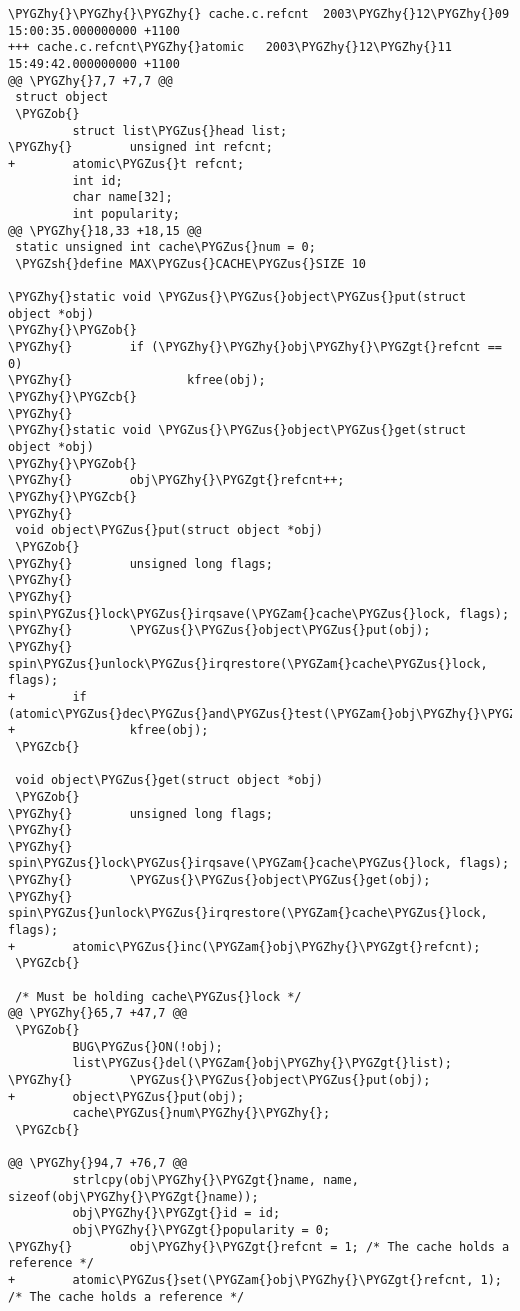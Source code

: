 \documentclass[a4paper,8pt,english]{sphinxmanual}
\def\PYGZus{\char`\_}
\def\PYGZob{\char`\{}
\def\PYGZcb{\char`\}}
\def\PYGZam{\char`\&}
\def\PYGZgt{\char`\>}
\def\PYGZsh{\char`\#}
\def\PYGZhy{\char`\-}
\begin{document}
\begin{Verbatim}[commandchars=\\\{\}]
\PYGZhy{}\PYGZhy{}\PYGZhy{} cache.c.refcnt  2003\PYGZhy{}12\PYGZhy{}09 15:00:35.000000000 +1100
+++ cache.c.refcnt\PYGZhy{}atomic   2003\PYGZhy{}12\PYGZhy{}11 15:49:42.000000000 +1100
@@ \PYGZhy{}7,7 +7,7 @@
 struct object
 \PYGZob{}
         struct list\PYGZus{}head list;
\PYGZhy{}        unsigned int refcnt;
+        atomic\PYGZus{}t refcnt;
         int id;
         char name[32];
         int popularity;
@@ \PYGZhy{}18,33 +18,15 @@
 static unsigned int cache\PYGZus{}num = 0;
 \PYGZsh{}define MAX\PYGZus{}CACHE\PYGZus{}SIZE 10

\PYGZhy{}static void \PYGZus{}\PYGZus{}object\PYGZus{}put(struct object *obj)
\PYGZhy{}\PYGZob{}
\PYGZhy{}        if (\PYGZhy{}\PYGZhy{}obj\PYGZhy{}\PYGZgt{}refcnt == 0)
\PYGZhy{}                kfree(obj);
\PYGZhy{}\PYGZcb{}
\PYGZhy{}
\PYGZhy{}static void \PYGZus{}\PYGZus{}object\PYGZus{}get(struct object *obj)
\PYGZhy{}\PYGZob{}
\PYGZhy{}        obj\PYGZhy{}\PYGZgt{}refcnt++;
\PYGZhy{}\PYGZcb{}
\PYGZhy{}
 void object\PYGZus{}put(struct object *obj)
 \PYGZob{}
\PYGZhy{}        unsigned long flags;
\PYGZhy{}
\PYGZhy{}        spin\PYGZus{}lock\PYGZus{}irqsave(\PYGZam{}cache\PYGZus{}lock, flags);
\PYGZhy{}        \PYGZus{}\PYGZus{}object\PYGZus{}put(obj);
\PYGZhy{}        spin\PYGZus{}unlock\PYGZus{}irqrestore(\PYGZam{}cache\PYGZus{}lock, flags);
+        if (atomic\PYGZus{}dec\PYGZus{}and\PYGZus{}test(\PYGZam{}obj\PYGZhy{}\PYGZgt{}refcnt))
+                kfree(obj);
 \PYGZcb{}

 void object\PYGZus{}get(struct object *obj)
 \PYGZob{}
\PYGZhy{}        unsigned long flags;
\PYGZhy{}
\PYGZhy{}        spin\PYGZus{}lock\PYGZus{}irqsave(\PYGZam{}cache\PYGZus{}lock, flags);
\PYGZhy{}        \PYGZus{}\PYGZus{}object\PYGZus{}get(obj);
\PYGZhy{}        spin\PYGZus{}unlock\PYGZus{}irqrestore(\PYGZam{}cache\PYGZus{}lock, flags);
+        atomic\PYGZus{}inc(\PYGZam{}obj\PYGZhy{}\PYGZgt{}refcnt);
 \PYGZcb{}

 /* Must be holding cache\PYGZus{}lock */
@@ \PYGZhy{}65,7 +47,7 @@
 \PYGZob{}
         BUG\PYGZus{}ON(!obj);
         list\PYGZus{}del(\PYGZam{}obj\PYGZhy{}\PYGZgt{}list);
\PYGZhy{}        \PYGZus{}\PYGZus{}object\PYGZus{}put(obj);
+        object\PYGZus{}put(obj);
         cache\PYGZus{}num\PYGZhy{}\PYGZhy{};
 \PYGZcb{}

@@ \PYGZhy{}94,7 +76,7 @@
         strlcpy(obj\PYGZhy{}\PYGZgt{}name, name, sizeof(obj\PYGZhy{}\PYGZgt{}name));
         obj\PYGZhy{}\PYGZgt{}id = id;
         obj\PYGZhy{}\PYGZgt{}popularity = 0;
\PYGZhy{}        obj\PYGZhy{}\PYGZgt{}refcnt = 1; /* The cache holds a reference */
+        atomic\PYGZus{}set(\PYGZam{}obj\PYGZhy{}\PYGZgt{}refcnt, 1); /* The cache holds a reference */


\end{Verbatim}
\end{document}
